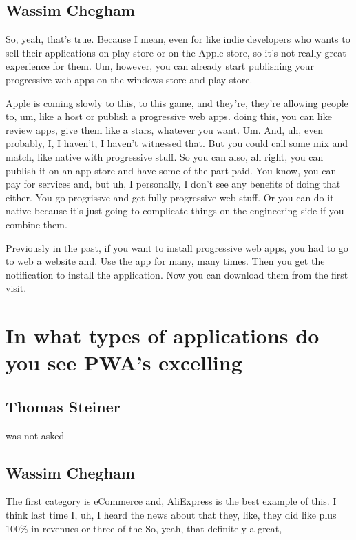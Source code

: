 		\subsection{Wassim Chegham}
			So, yeah, that's true. Because I mean, even for like indie developers who wants to sell their applications on play store or on the Apple store, so it's not really great experience for them. Um, however, you can already start publishing your progressive web apps on the windows store and play store.
			
			Apple is coming slowly to this, to this game, and they're, they're allowing people to, um, like a host or publish a progressive web apps. doing this, you can like review apps, give them like a stars, whatever you want. Um. And, uh, even probably, I, I haven't, I haven't witnessed that. But you could call some mix and match, like native with progressive stuff. So you can also, all right, you can publish it on an app store and have some of the part paid. You know, you can pay for services and, but uh, I personally, I don't see any benefits of doing that either. You go progrissve and  get fully progressive web stuff. Or you can do it native because it's just going to complicate things on the engineering side if you combine them. 
			
			Previously in the past, if you want to install  progressive web apps, you had to go to web a website and. Use the app for many, many times. Then you get the notification to install the application. Now you can download them from the first visit.
		
				
	\section{In what types of applications do you see PWA's excelling}
		
		\subsection{Thomas Steiner}
			was not asked

		\subsection{Wassim Chegham}	
			 The first category is eCommerce and, AliExpress is the best example of this. I think last time I, uh, I heard the news about that they, like, they did like plus 100\% in revenues or three of the So, yeah, that definitely a great, 
			 
